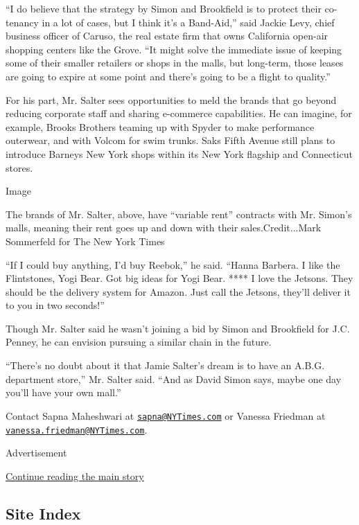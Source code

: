 ``I do believe that the strategy by Simon and Brookfield is to protect
their co-tenancy in a lot of cases, but I think it's a Band-Aid,'' said
Jackie Levy, chief business officer of Caruso, the real estate firm that
owns California open-air shopping centers like the Grove. ``It might
solve the immediate issue of keeping some of their smaller retailers or
shops in the malls, but long-term, those leases are going to expire at
some point and there's going to be a flight to quality.''

For his part, Mr. Salter sees opportunities to meld the brands that go
beyond reducing corporate staff and sharing e-commerce capabilities. He
can imagine, for example, Brooks Brothers teaming up with Spyder to make
performance outerwear, and with Volcom for swim trunks. Saks Fifth
Avenue still plans to introduce Barneys New York shops within its New
York flagship and Connecticut stores.

Image

The brands of Mr. Salter, above, have ``variable rent'' contracts with
Mr. Simon's malls, meaning their rent goes up and down with their
sales.Credit...Mark Sommerfeld for The New York Times

``If I could buy anything, I'd buy Reebok,'' he said. ``Hanna Barbera. I
like the Flintstones, Yogi Bear. Got big ideas for Yogi Bear. **** I
love the Jetsons. They should be the delivery system for Amazon. Just
call the Jetsons, they'll deliver it to you in two seconds!''

Though Mr. Salter said he wasn't joining a bid by Simon and Brookfield
for J.C. Penney, he can envision pursuing a similar chain in the future.

``There's no doubt about it that Jamie Salter's dream is to have an
A.B.G. department store,'' Mr. Salter said. ``And as David Simon says,
maybe one day you'll have your own mall.''

Contact Sapna Maheshwari at
\href{mailto:sapna@NYTimes.com}{\nolinkurl{sapna@NYTimes.com}} or
Vanessa Friedman at
\href{mailto:vanessa.friedman@NYTimes.com}{\nolinkurl{vanessa.friedman@NYTimes.com}}.

Advertisement

\protect\hyperlink{after-bottom}{Continue reading the main story}

\hypertarget{site-index}{%
\subsection{Site Index}\label{site-index}}

